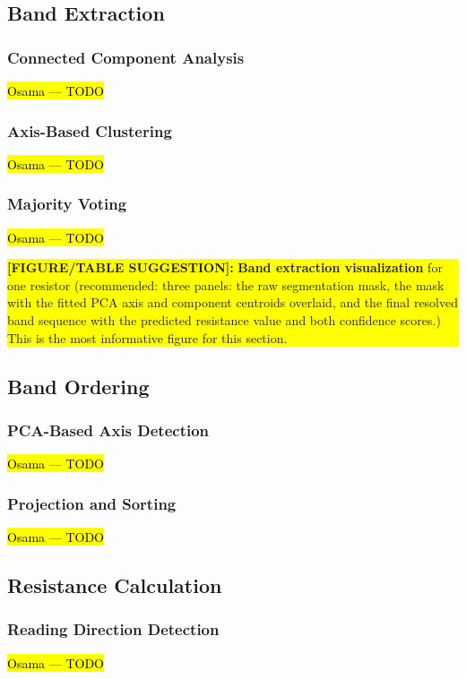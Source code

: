 \documentclass[conference]{IEEEtran}
\newcommand{\figbox}[1]{%
  \vspace{4pt}%
  \noindent
  \colorbox{yellow}{%
    \parbox{\dimexpr\columnwidth-2\fboxsep\relax}{%
      \small\textbf{[FIGURE/TABLE SUGGESTION]:} #1%
    }%
  }%
  \vspace{4pt}%
}
\begin{document}
\subsection{Band Extraction}

\subsubsection{Connected Component Analysis}
\hl{Osama — TODO}

\subsubsection{Axis-Based Clustering}
\hl{Osama — TODO}

\subsubsection{Majority Voting}
\hl{Osama — TODO}

\figbox{%
  \textbf{Band extraction visualization} for one resistor
  (recommended: three panels: the raw segmentation mask,
  the mask with the fitted PCA axis and component centroids
  overlaid, and the final resolved band sequence with the
  predicted resistance value and both confidence scores.)
  This is the most informative figure for this section.
}

\subsection{Band Ordering}

\subsubsection{PCA-Based Axis Detection}
\hl{Osama — TODO}

\subsubsection{Projection and Sorting}
\hl{Osama — TODO}

\subsection{Resistance Calculation}

\subsubsection{Reading Direction Detection}
\hl{Osama — TODO}
\end{document}
